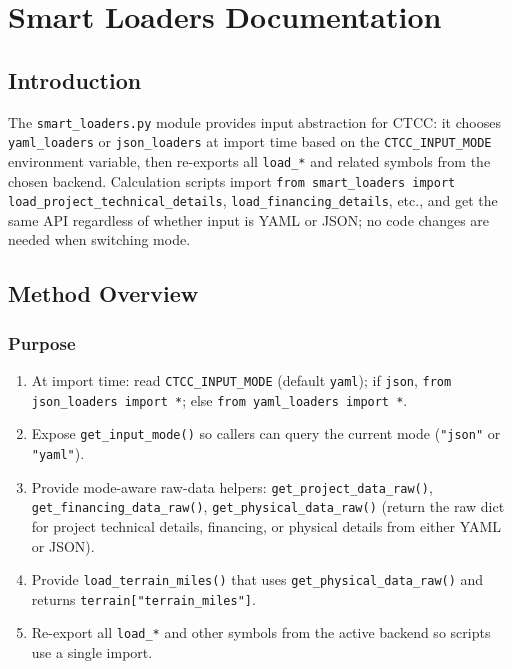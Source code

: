 \documentclass[ctcc_full_documentation.tex]{subfiles}
\begin{document}
\chapter{Smart Loaders Documentation}

\section{Introduction}

The \texttt{smart\_loaders.py} module provides input abstraction for CTCC: it chooses \texttt{yaml\_loaders} or \texttt{json\_loaders} at import time based on the \texttt{CTCC\_INPUT\_MODE} environment variable, then re-exports all \texttt{load\_*} and related symbols from the chosen backend. Calculation scripts import \texttt{from smart\_loaders import load\_project\_technical\_details}, \texttt{load\_financing\_details}, etc., and get the same API regardless of whether input is YAML or JSON; no code changes are needed when switching mode.

\section{Method Overview}

\subsection{Purpose}

\begin{enumerate}
    \item At import time: read \texttt{CTCC\_INPUT\_MODE} (default \texttt{yaml}); if \texttt{json}, \texttt{from json\_loaders import *}; else \texttt{from yaml\_loaders import *}.
    \item Expose \texttt{get\_input\_mode()} so callers can query the current mode (\texttt{"json"} or \texttt{"yaml"}).
    \item Provide mode-aware raw-data helpers: \texttt{get\_project\_data\_raw()}, \texttt{get\_financing\_data\_raw()}, \texttt{get\_physical\_data\_raw()} (return the raw dict for project technical details, financing, or physical details from either YAML or JSON).
    \item Provide \texttt{load\_terrain\_miles()} that uses \texttt{get\_physical\_data\_raw()} and returns \texttt{terrain["terrain\_miles"]}.
    \item Re-export all \texttt{load\_*} and other symbols from the active backend so scripts use a single import.
\end{enumerate}
\end{document}
